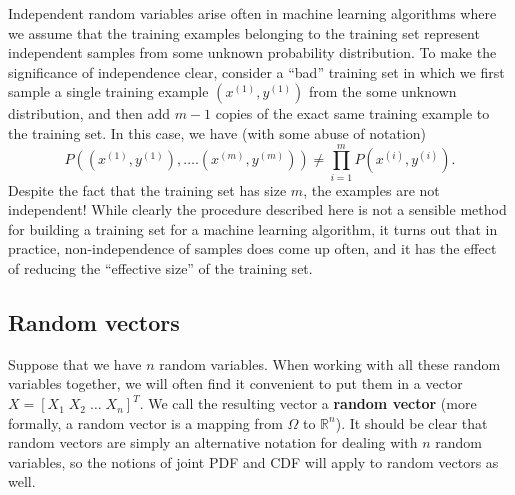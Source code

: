 \documentclass{article}
\begin{document}
Independent random variables arise often in machine learning
algorithms where we assume that the training examples belonging to the
training set represent independent samples from some unknown
probability distribution.  To make the significance of independence clear, consider a ``bad''
training set in which we first sample a single training example
$(x^{(1)},y^{(1)})$ from the some unknown distribution, and then add
$m-1$ copies of the exact same training example to the training set.
In this case, we have (with some abuse of notation)
\begin{equation*}
  P( (x^{(1)},y^{(1)}), \ldots. (x^{(m)},y^{(m)}) ) \neq \prod_{i=1}^m P(x^{(i)},y^{(i)}).
\end{equation*}
Despite the fact that the training set has size $m$, the examples are
not independent!  While clearly the procedure described here is not a
sensible method for building a training set for a machine learning
algorithm, it turns out that in practice, non-independence of samples
does come up often, and it has the effect of reducing the ``effective
size'' of the training set.

\subsection{Random vectors}
Suppose that we have $n$ random variables. When working with all these
random variables together, we will often find it convenient to put
them in a vector $X=[X_1\; X_2\; \ldots\; X_n]^T$.  We call the
resulting vector a \textbf{random vector} (more formally, a random
vector is a mapping from $\Omega$ to $\mathbb{R}^n$). It should be
clear that random vectors are simply an alternative notation for dealing with $n$
random variables, so the notions of joint PDF and CDF will apply to
random vectors as well.
\end{document}
